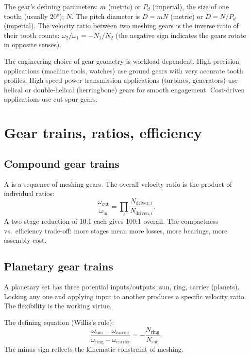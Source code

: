 The gear's defining parameters:  $m$ (metric) or  $P_d$ (imperial), the size of one tooth;  (usually 20°);  $N$. The pitch diameter is $D = mN$ (metric) or $D = N/P_d$ (imperial). The velocity ratio between two meshing gears is the inverse ratio of their tooth counts: $\omega_2 / \omega_1 = -N_1 / N_2$ (the negative sign indicates the gears rotate in opposite senses).

The engineering choice of gear geometry is workload-dependent. High-precision applications (machine tools, watches) use ground gears with very accurate tooth profiles. High-speed power-transmission applications (turbines, generators) use helical or double-helical (herringbone) gears for smooth engagement. Cost-driven applications use cut spur gears.

\section{Gear trains, ratios, efficiency}

\subsection{Compound gear trains}

A  is a sequence of meshing gears. The overall velocity ratio is the product of individual ratios:
\[
\frac{\omega_{\mathrm{out}}}{\omega_{\mathrm{in}}} = \prod_i \frac{N_{\mathrm{driver}, i}}{N_{\mathrm{driven}, i}}.
\]
A two-stage reduction of 10:1 each gives 100:1 overall. The compactness vs.\ efficiency trade-off: more stages mean more losses, more bearings, more assembly cost.

\subsection{Planetary gear trains}

A planetary set has three potential inputs/outputs: sun, ring, carrier (planets). Locking any one and applying input to another produces a specific velocity ratio. The flexibility is the working virtue.

The defining equation (Willis's rule):
\[
\frac{\omega_{\mathrm{sun}} - \omega_{\mathrm{carrier}}}{\omega_{\mathrm{ring}} - \omega_{\mathrm{carrier}}} = -\frac{N_{\mathrm{ring}}}{N_{\mathrm{sun}}}.
\]
The minus sign reflects the kinematic constraint of meshing.

